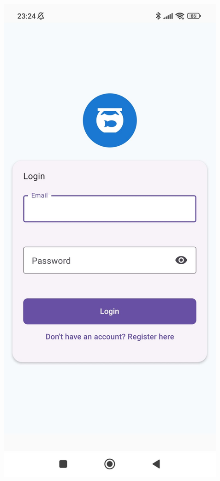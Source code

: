 \documentclass[11pt,a4paper]{article}
\begin{document}
\begin{figure}[H]
    \centering
    \begin{minipage}{0.35\textwidth}
        \centering
        \includegraphics[width=\linewidth]{Images/Login form.jpeg}

\end{minipage}
\end{figure}
\end{document}
